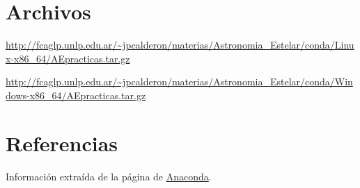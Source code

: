 \documentclass[a4paper, 12pt]{article}
\begin{document}
\section{Archivos}

\url{http://fcaglp.unlp.edu.ar/~jpcalderon/materias/Astronomia_Estelar/conda/Linux-x86_64/AEpracticas.tar.gz}


\url{http://fcaglp.unlp.edu.ar/~jpcalderon/materias/Astronomia_Estelar/conda/Windows-x86_64/AEpracticas.tar.gz}

\section{Referencias}
Información extraída de la página de \href{https://www.anaconda.com/blog/moving-conda-environments}{Anaconda}.
\end{document}
